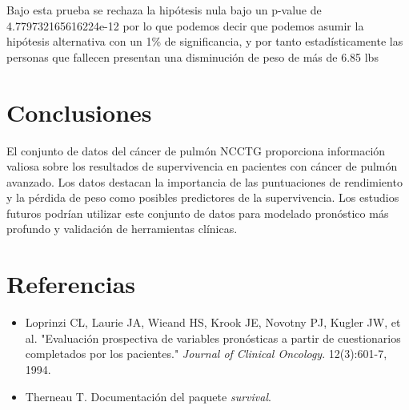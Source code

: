 \documentclass[a4paper,12pt]{article}
\begin{document}
Bajo esta prueba se rechaza la hipótesis nula bajo un p-value de 4.779732165616224e-12 por lo que podemos decir que podemos asumir la hipótesis alternativa con un 1\% de significancia, y por tanto estadísticamente las personas que fallecen presentan una disminución de peso de más de 6.85 lbs

   

	\section*{Conclusiones}
	El conjunto de datos del cáncer de pulmón NCCTG proporciona información valiosa sobre los resultados de supervivencia en pacientes con cáncer de pulmón avanzado. Los datos destacan la importancia de las puntuaciones de rendimiento y la pérdida de peso como posibles predictores de la supervivencia. Los estudios futuros podrían utilizar este conjunto de datos para modelado pronóstico más profundo y validación de herramientas clínicas.
	
	\section*{Referencias}
	\begin{itemize}
		\item Loprinzi CL, Laurie JA, Wieand HS, Krook JE, Novotny PJ, Kugler JW, et al. "Evaluación prospectiva de variables pronósticas a partir de cuestionarios completados por los pacientes." \textit{Journal of Clinical Oncology}. 12(3):601-7, 1994.
		\item Therneau T. Documentación del paquete \textit{survival}.
	\end{itemize}
	
\end{document}
